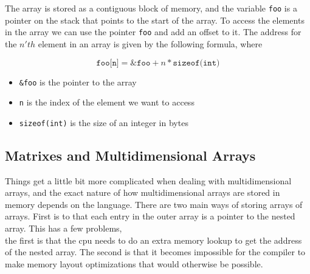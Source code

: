 The array is stored as a contiguous block of memory, and the variable \texttt{foo} is a pointer on the stack that points to the start of the array.
To access the elements in the array we can use the pointer \texttt{foo} and add an offset to it.
The address for the $n'th$ element in an array is given by the following formula, where

\begin{equation*}
    \texttt{foo[n]} = \texttt{\&foo} + n * \texttt{sizeof(int)}
\end{equation*}
\begin{itemize}
    \item \texttt{\&foo} is the pointer to the array
    \item \texttt{n} is the index of the element we want to access
    \item \texttt{sizeof(int)} is the size of an integer in bytes
\end{itemize}


\subsection{Matrixes and Multidimensional Arrays}
Things get a little bit more complicated when dealing with multidimensional arrays, and the exact nature of how multidimensional arrays are stored in memory depends on the language.
There are two main ways of storing arrays of arrays.
First is to that each entry in the outer array is a pointer to the nested array.
This has a few problems,\\
the first is that the cpu needs to do an extra memory lookup to get the address of the nested array.
The second is that it becomes impossible for the compiler to make memory layout optimizations that would otherwise be possible.

